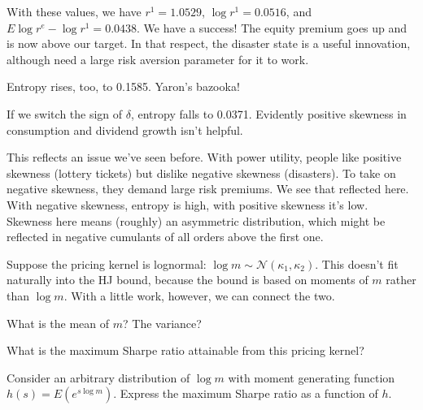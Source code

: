 \documentclass[11pt]{exam}
\begin{document}
\begin{questions}
\begin{solution}
\begin{parts}
\item With these values, we have
$r^1 = 1.0529$, $\log r^1 = 0.0516$, and
$E \log r^e - \log r^1 = 0.0438 $.
We have a success!
The equity premium goes up and is now above our target.
In that respect, the disaster state is a useful innovation,
although need a large risk aversion parameter for it to work.

\item Entropy rises, too, to 0.1585.  Yaron's bazooka!

\item If we switch the sign of $\delta$,
entropy falls to 0.0371.
Evidently positive skewness in consumption and dividend growth
isn't helpful.

This reflects an issue we've seen before.  With power utility,
people like positive skewness (lottery tickets)
but dislike negative skewness (disasters).
To take on negative skewness, they demand large risk premiums.
We see that reflected here.
With negative skewness, entropy is high, with positive skewness
it's low.
Skewness here means (roughly) an asymmetric distribution,
which might be reflected in negative cumulants of all orders above the first one.
\end{parts}
\end{solution}

Suppose the pricing kernel is lognormal:
$ \log m \sim \mathcal{N}(\kappa_1,\kappa_2)$.
This doesn't fit naturally into the HJ bound, because the bound
is based on moments of $m$ rather than $\log m$.
With a little work, however, we can connect the two.
%
\begin{parts}
\item What is the mean of $m$?  The variance?
\item What is the maximum Sharpe ratio attainable from this pricing kernel?
\item Consider an arbitrary distribution of $\log m$ with
moment generating function
$ h(s) = E (e^{s \log m} )$.
Express the maximum Sharpe ratio as a function of $h$.
\end{parts}


\end{questions}
\end{document}
